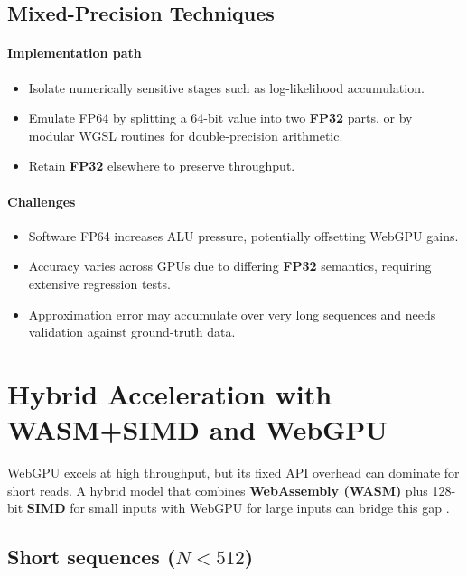 \documentclass[PhD]{PHlab-thesis}
\begin{document}
\subsection*{Mixed-Precision Techniques}

\paragraph{Implementation path}
\begin{itemize}
  \item Isolate numerically sensitive stages such as log-likelihood accumulation.
  \item Emulate FP64 by splitting a 64-bit value into two \textbf{FP32} parts, or by modular WGSL routines for double-precision arithmetic.
  \item Retain \textbf{FP32} elsewhere to preserve throughput.
\end{itemize}

\paragraph{Challenges}
\begin{itemize}
  \item Software FP64 increases ALU pressure, potentially offsetting WebGPU gains.
  \item Accuracy varies across GPUs due to differing \textbf{FP32} semantics, requiring extensive regression tests.
  \item Approximation error may accumulate over very long sequences and needs validation against ground-truth data.
\end{itemize}

\section{Hybrid Acceleration with WASM+SIMD and WebGPU}

WebGPU excels at high throughput, but its fixed API overhead can dominate for short reads. A hybrid model that combines \textbf{WebAssembly (WASM)} plus 128-bit \textbf{SIMD} for small inputs with WebGPU for large inputs can bridge this gap \cite{MDN2023-simd}.

\subsection{Short sequences ($N < 512$)}
\end{document}
